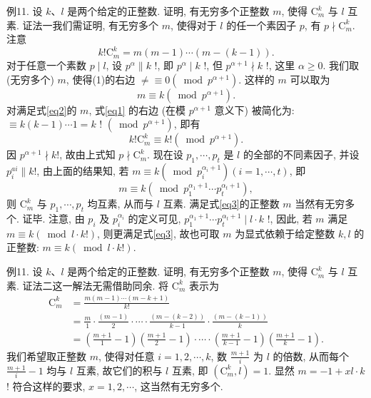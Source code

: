 例11. 设 $k 、 l$ 是两个给定的正整数.
证明, 有无穷多个正整数 $m$, 使得 $\mathrm{C}_m^k$ 与 $l$ 互素.
证法一我们需证明, 有无穷多个 $m$, 使得对于 $l$ 的任一个素因子 $p$, 有 $p \nmid \mathrm{C}_m^k$. 注意
$$
k ! \mathrm{C}_m^k=m(m-1) \cdots(m-(k-1)) . \label{eq1}
$$
对于任意一个素数 $p \mid l$, 设 $p^\alpha \| k$ !, 即 $p^\alpha \mid k$ !, 但 $p^{\alpha+1} \nmid k$ !, 这里 $\alpha \geqslant 0$. 我们取 (无穷多个) $m$, 使得(1)的右边 $\neq \equiv 0\left(\bmod p^{\alpha+1}\right)$. 这样的 $m$ 可以取为
$$
m \equiv k\left(\bmod p^{\alpha+1}\right) . \label{eq2}
$$
对满足式\ref{eq2}的 $m$, 式\ref{eq1} 的右边 (在模 $p^{\alpha+1}$ 意义下) 被简化为: $\equiv k(k-1) \cdots 1=k$ ! $\left(\bmod p^{\alpha+1}\right)$, 即有
$$
k ! \mathrm{C}_m^k \equiv k !\left(\bmod p^{\alpha+1}\right) . \label{eq3}
$$
因 $p^{\alpha+1} \nmid k !$, 故由上式知 $p \nmid \mathrm{C}_m^k$.
现在设 $p_1, \cdots, p_t$ 是 $l$ 的全部的不同素因子, 并设 $p_i^{a i} \| k !$, 由上面的结果知, 若 $m \equiv k\left(\bmod p_i^{\alpha_i+1}\right)(i=1, \cdots, t)$, 即
$$
m \equiv k\left(\bmod p_1^{\alpha_1+1} \cdots p_t^{\alpha_t+1}\right),
$$
则 $\mathrm{C}_m^k$ 与 $p_1, \cdots, p_t$ 均互素, 从而与 $l$ 互素.
满足式\ref{eq3}的正整数 $m$ 当然有无穷多个.
证毕.
注意, 由 $p_i$ 及 $p_i^{\alpha_i}$ 的定义可见, $p_1^{\alpha_1+1} \cdots p_t^{\alpha_t+1} \mid l \cdot k$ !, 因此, 若 $m$ 满足 $m \equiv k(\bmod l \cdot k !)$, 则更满足式\ref{eq3}, 故也可取 $m$ 为显式依赖于给定整数 $k, l$ 的正整数: $m \equiv k(\bmod l \cdot k !)$.



例11. 设 $k 、 l$ 是两个给定的正整数.
证明, 有无穷多个正整数 $m$, 使得 $\mathrm{C}_m^k$ 与 $l$ 互素.
证法二这一解法无需借助同余.
将 $\mathrm{C}_m^k$ 表示为
$$
\begin{aligned}
\mathrm{C}_m^k & =\frac{m(m-1) \cdots(m-k+1)}{k !} \\
& =\frac{m}{1} \cdot \frac{(m-1)}{2} \cdot \cdots \cdot \frac{(m-(k-2))}{k-1} \cdot \frac{(m-(k-1))}{k} \\
& =\left(\frac{m+1}{1}-1\right)\left(\frac{m+1}{2}-1\right) \cdot \cdots \cdot\left(\frac{m+1}{k-1}-1\right)\left(\frac{m+1}{k}-1\right) .
\end{aligned}
$$
我们希望取正整数 $m$, 使得对任意 $i=1,2, \cdots, k$, 数 $\frac{m+1}{i}$ 为 $l$ 的倍数, 从而每个 $\frac{m+1}{i}-1$ 均与 $l$ 互素, 故它们的积与 $l$ 互素, 即 $\left(\mathrm{C}_m^k, l\right)=1$. 显然 $m= -1+x l \cdot k$ ! 符合这样的要求, $x=1,2, \cdots$, 这当然有无穷多个.


